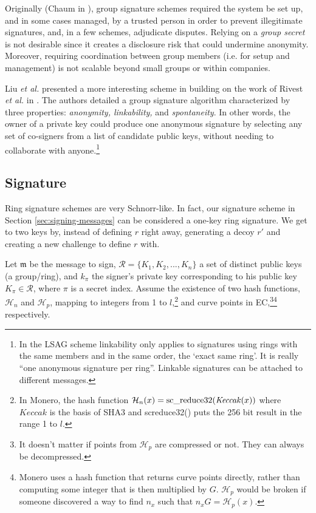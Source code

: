 Originally (Chaum in \cite{Chaum:1991:GS:1754868.1754897}), group signature schemes required the system be set up, and in some cases managed, by a trusted person in order to prevent illegitimate signatures, and, in a few schemes, adjudicate disputes. Relying on a {\em group secret} is not desirable since it creates a disclosure risk that could undermine anonymity. Moreover, requiring coordination between group members (i.e. for setup and management) is not scalable beyond small groups or within companies.

Liu {\em et al.} presented a more interesting scheme in \cite{Liu2004} building on the work of Rivest {\em et al.} in \cite{rivest-leak-secret}. The authors detailed a group signature algorithm characterized by three properties: {\em anonymity, linkability,} and {\em spontaneity}. In other words, the owner of a private key could produce one anonymous signature by selecting any set of co-signers from a list of candidate public keys, without needing to collaborate with anyone.\footnote{\label{lsag_linkability_note}In the LSAG scheme linkability only applies to signatures using rings with the same members and in the same order, the `exact same ring’. It is really ``one anonymous signature per ring”. Linkable signatures can be attached to different messages.}


\subsection*{Signature}

Ring signature schemes are very Schnorr-like. In fact, our signature scheme in Section \ref{sec:signing-messages} can be considered a one-key ring signature. We get to two keys by, instead of defining $r$ right away, generating a decoy $r'$ and creating a new challenge to define $r$ with.

Let \(\mathfrak{m}\) be the message to sign, \(\mathcal{R} = \{K_1, K_2, ..., K_n\}\) a set of distinct public keys (a group/ring), and \(k_\pi\) the signer's private key corresponding to his public key \(K_\pi \in \mathcal{R}\), where $\pi$ is a secret index. Assume the existence of two hash functions, \(\mathcal{H}_n\) and \(\mathcal{H}_p\),
mapping to integers from 1 to $l$,\footnote{In Monero, the hash function $\mathcal{H}_n(x) = \textrm{sc\textunderscore reduce32}(\mathit{Keccak}(x))$ where $\mathit{Keccak}$ is the basis of SHA3 and sc\textunderscore reduce32() puts the 256 bit result in the range 1 to $l$.} and curve points in EC,\footnote{It doesn’t matter if points from $\mathcal{H}_p$ are compressed or not. They can always be decompressed.}\footnote{Monero uses a hash function that returns curve points directly, rather than computing some integer that is then multiplied by $G$. $\mathcal{H}_p$ would be broken if someone discovered a way to find $n_x$ such that $n_x G = \mathcal{H}_p(x)$.} respectively.

